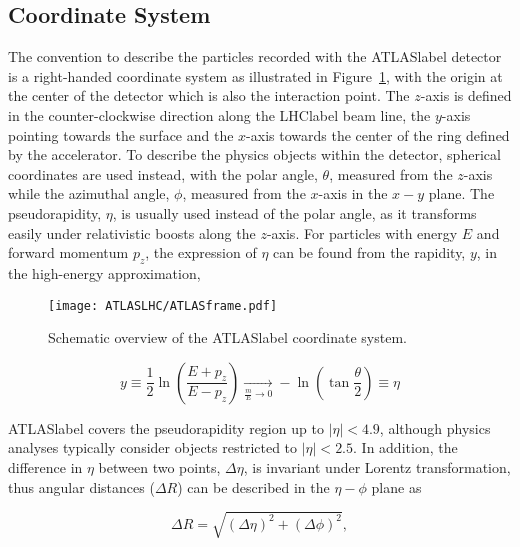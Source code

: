 \subsection{Coordinate System}

The convention to describe the particles recorded with the \acrshort{ATLASlabel} detector is a right-handed coordinate system as illustrated in Figure~\ref{figLHC:ATLASframe}, with the origin at the center of the detector which is also the interaction point. The $z$-axis is defined in the counter-clockwise direction along the \acrshort{LHClabel} beam line, the $y$-axis pointing towards the surface and the $x$-axis towards the center of the ring defined by the accelerator. To describe the physics objects within the detector, spherical coordinates are used instead, with the polar angle, $\theta$, measured from the $z$-axis while the azimuthal angle, $\phi$, measured from the $x$-axis in the $x-y$ plane. The pseudorapidity, $\eta$, is usually used instead of the polar angle, as it transforms easily under relativistic boosts along the $z$-axis. For particles with energy $E$ and forward momentum $p_z$, the expression of $\eta$ can be found from the rapidity, $y$, in the high-energy approximation,

\begin{figure}[htbp]
    \RawFloats
    \begin{center}
    \texttt{[image: ATLASLHC/ATLASframe.pdf]}
    \caption{
        Schematic overview of the \acrshort{ATLASlabel} coordinate system. 
    }
    \label{figLHC:ATLASframe}
    \end{center}
\end{figure}

\begin{equation}
   y \equiv \frac{1}{2}\ln\left(\frac{E+p_z}{E-p_z}\right) \xrightarrow[ \frac{m}{E} \to 0]{} -\ln\left(\tan\frac{\theta}{2}\right)\equiv \eta
\end{equation}

\acrshort{ATLASlabel} covers the pseudorapidity region up to $|\eta|<4.9$, although physics analyses
typically consider objects restricted to $|\eta|<2.5$. In addition, the difference in $\eta$ between two points, $\Delta\eta$, is invariant under Lorentz transformation, thus angular distances ($\Delta R$) can be described in the $\eta-\phi$ plane as

\begin{equation}
    \Delta R = \sqrt{\left(\Delta\eta\right)^2+\left(\Delta\phi\right)^2},
\end{equation}

